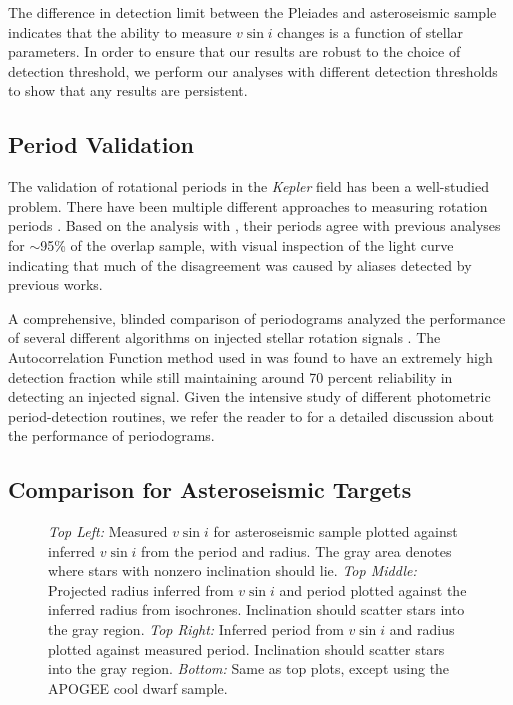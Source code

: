 \documentclass[manuscript]{aastex6}
\newcommand{\vsini}{\ensuremath{v \sin i}}
\newcommand{\Kepler}{\mbox{\textit{Kepler}}}
\begin{document}
The difference in detection limit between the Pleiades and asteroseismic sample
indicates that the ability to measure \vsini{} changes is a function of stellar
parameters. In order to ensure that our results are robust to the choice of
detection threshold, we
perform our analyses with different detection thresholds to show that any
results are persistent.

\subsection{Period Validation}

The validation of rotational periods in the \Kepler{} field has been a
well-studied problem. There have been multiple different approaches to
measuring rotation periods \citep{Reinhold13,Nielsen13,McQuillan14,Garcia14}.
Based on the analysis with \citet{McQuillan14}, their periods agree with
previous analyses for \(\sim\)95\% of the overlap sample, with visual 
inspection of the light curve indicating that much of the disagreement was 
caused by aliases detected by previous works. 

A comprehensive, blinded comparison of periodograms analyzed the performance of
several different algorithms on injected stellar rotation signals 
\citep{Aigrain15}. The Autocorrelation Function method used in \citet{McQuillan14} was 
found to have an extremely high detection fraction while still maintaining 
around 70 percent reliability in detecting an injected signal. Given the 
intensive study of different photometric period-detection routines, we refer 
the reader to \citet{Aigrain15} for a detailed discussion about the 
performance of periodograms.

\subsection{Comparison for Asteroseismic Targets}
\label{sec:astero}

\begin{figure*}
    \caption{\emph{Top Left:} Measured \vsini{} for asteroseismic sample plotted
        against inferred \vsini{} from the period and radius. The gray area
        denotes where stars with nonzero inclination should lie. 
        \emph{Top Middle:} Projected radius inferred from \vsini{} and period 
        plotted against the inferred radius from isochrones. Inclination should
        scatter stars into the gray region. \emph{Top Right:} Inferred period 
        from \vsini{} and radius plotted against measured period. Inclination
        should scatter stars into the gray region. \emph{Bottom:} Same as top 
        plots, except using the APOGEE cool dwarf 
    sample.\label{fig:rot}}
\end{figure*}
\end{document}
